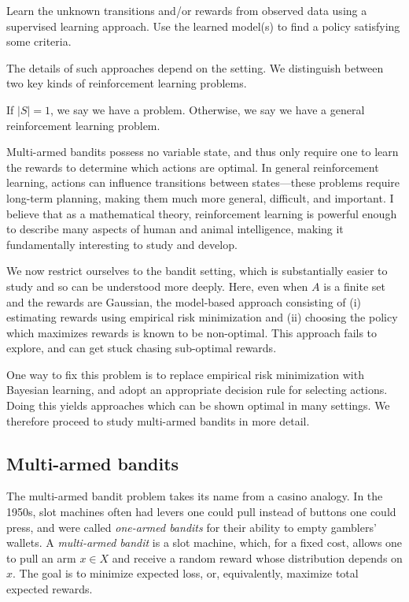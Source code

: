\documentclass[11pt]{book}
\begin{document}
\1 Learn the unknown transitions and/or rewards from observed data using a supervised learning approach.
\2 Use the learned model(s) to find a policy satisfying some criteria.
\0 

The details of such approaches depend on the setting.
We distinguish between two key kinds of reinforcement learning problems.

\1 If $|S| = 1$, we say we have a  problem.
\2 Otherwise, we say we have a general reinforcement learning problem.
\0 

Multi-armed bandits possess no variable state, and thus only require one to learn the rewards to determine which actions are optimal.
In general reinforcement learning, actions can influence transitions between states---these problems require long-term planning, making them much more general, difficult, and important.
I believe that as a mathematical theory, reinforcement learning is powerful enough to describe many aspects of human and animal intelligence, making it fundamentally interesting to study and develop.

We now restrict ourselves to the bandit setting, which is substantially easier to study and so can be understood more deeply.
Here, even when $A$ is a finite set and the rewards are Gaussian, the model-based approach consisting of (i) estimating rewards using empirical risk minimization and (ii) choosing the policy which maximizes rewards is known to be non-optimal.
This approach fails to explore, and can get stuck chasing sub-optimal rewards.

One way to fix this problem is to replace empirical risk minimization with Bayesian learning, and adopt an appropriate decision rule for selecting actions.
Doing this yields approaches which can be shown optimal in many settings.
We therefore proceed to study multi-armed bandits in more detail.

\subsection{Multi-armed bandits}

The multi-armed bandit problem takes its name from a casino analogy.
In the 1950s, slot machines often had levers one could pull instead of buttons one could press, and were called \emph{one-armed bandits} for their ability to empty gamblers' wallets.
A \emph{multi-armed bandit} is a slot machine, which, for a fixed cost, allows one to pull an arm $x \in X$ and receive a random reward whose distribution depends on $x$.
The goal is to minimize  expected loss, or, equivalently, maximize total expected rewards.
\end{document}
